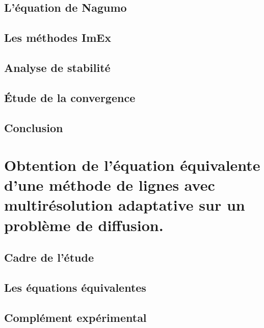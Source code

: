 \documentclass[11pt]{report}
\theoremstyle{definition}
\theoremstyle{remark}
\begin{document}
        \subsection{L'équation de Nagumo}
        \newpage
        \subsection{Les méthodes ImEx}
        \newpage
        \subsection{Analyse de stabilité}
        \newpage
        \subsection{Étude de la convergence}
        \newpage
        \subsection{Conclusion}
    
    \newpage
    \section{Obtention de l'équation équivalente d'une méthode de lignes avec multirésolution adaptative sur un problème de diffusion.}
        \label{par:contrib_2}
        
        \newpage
        \subsection{Cadre de l'étude}                   
        \subsection{Les équations équivalentes}
            \label{par:contrib_2:resultats}
            
        \newpage
        \subsection{Complément expérimental}
            \label{par:contrib_2:exp}
            
\end{document}
